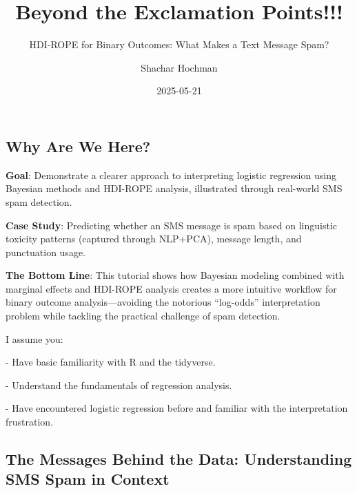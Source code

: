 \documentclass[
  letterpaper,
  DIV=11,
  numbers=noendperiod]{scrartcl}
\title{Beyond the Exclamation Points!!!}
\subtitle{HDI-ROPE for Binary Outcomes: What Makes a Text Message Spam?}
\author{Shachar Hochman}
\date{2025-05-21}
\begin{document}
\maketitle


\subsection{Why Are We Here?}\label{why-are-we-here}

\textbf{Goal}: Demonstrate a clearer approach to interpreting logistic
regression using Bayesian methods and HDI-ROPE analysis, illustrated
through real-world SMS spam detection.

\textbf{Case Study}: Predicting whether an SMS message is spam based on
linguistic toxicity patterns (captured through NLP+PCA), message length,
and punctuation usage.

\textbf{The Bottom Line}: This tutorial shows how Bayesian modeling
combined with marginal effects and HDI-ROPE analysis creates a more
intuitive workflow for binary outcome analysis---avoiding the notorious
``log-odds'' interpretation problem while tackling the practical
challenge of spam detection.

\begin{tcolorbox}[enhanced jigsaw, coltitle=black, colframe=quarto-callout-caution-color-frame, breakable, leftrule=.75mm, colbacktitle=quarto-callout-caution-color!10!white, bottomtitle=1mm, toprule=.15mm, titlerule=0mm, rightrule=.15mm, title=\textcolor{quarto-callout-caution-color}{\faFire}\hspace{0.5em}{I make assumptions (too)!}, arc=.35mm, opacitybacktitle=0.6, colback=white, left=2mm, toptitle=1mm, opacityback=0, bottomrule=.15mm]

I assume you:

- Have basic familiarity with R and the tidyverse.

- Understand the fundamentals of regression analysis.

- Have encountered logistic regression before and familiar with the
interpretation frustration.

\end{tcolorbox}

\subsection{The Messages Behind the Data: Understanding SMS Spam in
Context}\label{the-messages-behind-the-data-understanding-sms-spam-in-context}
\end{document}
